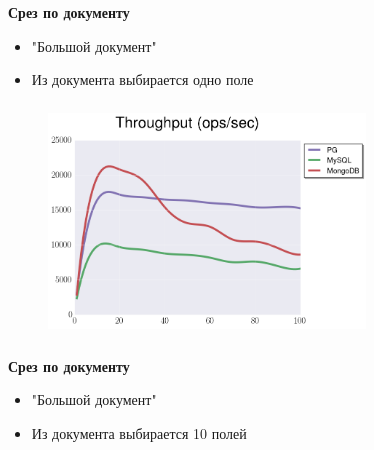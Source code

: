 \documentclass[usenames,dvipsnames, 18pt, compress, aspectratio=169]{beamer}
\begin{document}

\begin{frame}
    \frametitle{}
    \begin{center}
        \textbf{Срез по документу}
        \begin{itemize}[label={}]
            \item "Большой документ"
            \item Из документа выбирается одно поле
        \end{itemize}
    \end{center}
\end{frame}

\begin{frame}
    \frametitle{}
    \begin{center}
    \begin{figure}
        \includegraphics[width=0.75\textwidth,center]{benchmarks/select_slice_1_btree_throughput.png}
    \end{figure}
    \end{center}
\end{frame}

\begin{frame}
    \frametitle{}
    \begin{center}
        \textbf{Срез по документу}
        \begin{itemize}[label={}]
            \item "Большой документ"
            \item Из документа выбирается 10 полей
        \end{itemize}
    \end{center}
\end{frame}
\end{document}
